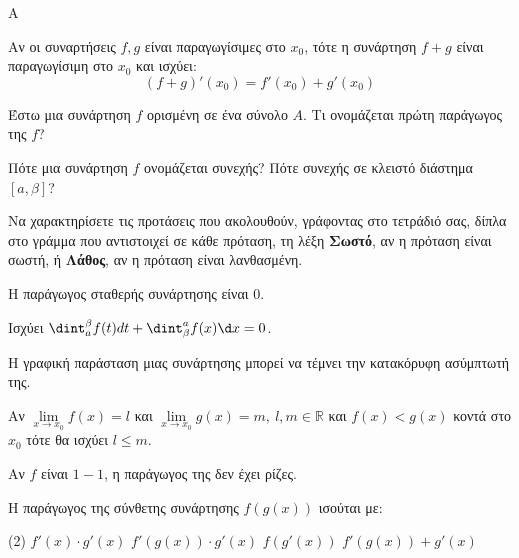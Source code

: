 \begin{thema}{A}
\begin{erwthma}
    \item Αν οι συναρτήσεις $ f,g $ είναι παραγωγίσιμες στο $ x_0 $, τότε η συνάρτηση $ f+g $ είναι παραγωγίσιμη στο $ x_0 $ και ισχύει: \[ (f+g)'(x_0)=f'(x_0)+g'(x_0) \]
    \item Έστω μια συνάρτηση $f$ ορισμένη σε ένα σύνολο $A$. Τι ονομάζεται πρώτη παράγωγος της $f$?
    \item Πότε μια συνάρτηση $f$ ονομάζεται συνεχής? Πότε συνεχής σε κλειστό διάστημα $[a, \beta]$?
    \item Να χαρακτηρίσετε τις προτάσεις που ακολουθούν, γράφοντας στο τετράδιό σας, δίπλα στο γράμμα που αντιστοιχεί σε κάθε πρόταση, τη λέξη \textbf{Σωστό}, αν η πρόταση είναι σωστή, ή \textbf{Λάθος}, αν η πρόταση είναι λανθασμένη.
    \begin{alist}
        \item Η παράγωγος σταθερής συνάρτησης είναι $0$.
        \item Ισχύει $\dint_a^\beta f(t) dt + \dint_\beta^a f(x) \d x = 0$.
        \item Η γραφική παράσταση μιας συνάρτησης μπορεί να τέμνει την κατακόρυφη ασύμπτωτή της.
        \item Αν $\lim\limits_{x\to x_0}{f(x)}=l$ και $\lim\limits_{x\to x_0}{g(x)}=m,\ l,m\in\mathbb{R}$ και $f(x)<g(x)$ κοντά στο $x_0$ τότε θα ισχύει $l\leq m$.
        \item Αν $f$ είναι $1-1$, η παράγωγος της δεν έχει ρίζες.
    \end{alist}
    \item Η παράγωγος της σύνθετης συνάρτησης $f(g(x))$ ισούται με:
    \begin{tasks}[label=\let\textdexiakeraia\relax\alph*.](2)
        \task $f'(x) \cdot g'(x)$
        \task $f'(g(x)) \cdot g'(x)$
        \task $f(g'(x))$
        \task $f'(g(x)) + g'(x)$
    \end{tasks}
\end{erwthma}
\end{thema}


